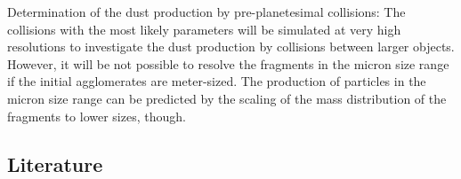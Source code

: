 Determination of the dust production by pre-planetesimal collisions:
The collisions with the most likely parameters
will be simulated at very high resolutions to investigate the dust
production by collisions between larger objects. However, it will be not
possible to resolve the fragments in the micron size range if the
initial agglomerates are meter-sized. The production of particles in the
micron size range can be predicted by the scaling of the mass
distribution of the fragments to lower sizes, though.

\subsection{Literature}
%
%
%
